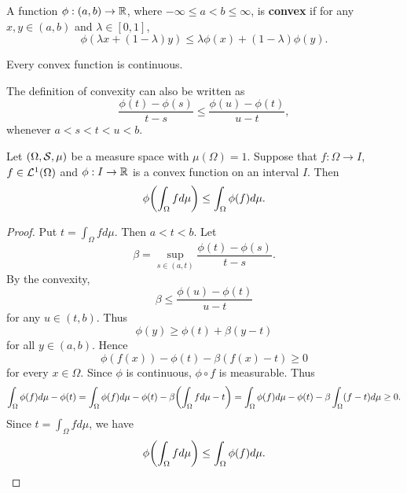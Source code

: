 \begin{definition}
    A function $\phi:(a,b)\to\R$, where $-\infty\leq a < b\leq \infty$, is 
    \textbf{convex} if for any $x,y\in(a,b)$ and $\lambda\in[0,1]$,
    \begin{equation*}
        \phi(\lambda x + (1-\lambda)y) \leq \lambda\phi(x) + (1-\lambda)\phi(y).
    \end{equation*}
\end{definition}
\begin{remark}
    Every convex function is continuous. 
\end{remark}
\begin{remark}
    The definition of convexity can also be written as 
    \begin{equation*}
        \frac{\phi(t)-\phi(s)}{t-s} \leq \frac{\phi(u)-\phi(t)}{u-t},
    \end{equation*}
    whenever $a<s<t<u<b$. 
\end{remark}

\begin{theorem}
    Let $(\Omega,\S,\mu)$ be a measure space with $\mu(\Omega) = 1$. Suppose 
    that $f:\Omega\to I$, $f\in\L^1(\Omega)$ and $\phi:I\to\R$ is a convex 
    function on an interval $I$. Then 
    \begin{equation*}
        \phi\pth{\int_\Omega f d\mu} \leq \int_\Omega \phi(f) d\mu.
    \end{equation*}
\end{theorem}
\begin{proof}
    Put $t = \int_\Omega fd\mu$. Then $a<t<b$. Let 
    \begin{equation*}
        \beta = \sup_{s\in(a,t)} \frac{\phi(t)-\phi(s)}{t-s}.
    \end{equation*}
    By the convexity, 
    \begin{equation*}
        \beta \leq \frac{\phi(u)-\phi(t)}{u-t}
    \end{equation*}
    for any $u\in(t,b)$. Thus 
    \begin{equation*}
        \phi(y) \geq \phi(t) + \beta(y-t)
    \end{equation*}
    for all $y\in(a,b)$. Hence 
    \begin{equation*}
        \phi(f(x)) - \phi(t) - \beta(f(x)-t) \geq 0
    \end{equation*}
    for every $x\in\Omega$. Since $\phi$ is continuous, $\phi\circ f$ is 
    measurable. Thus 
    \begin{equation*}
        \int_\Omega \phi(f) d\mu - \phi(t) = \int_\Omega \phi(f) d\mu - \phi(t) - \beta\pth{\int_\Omega fd\mu - t}
        = \int_\Omega \phi(f) d\mu - \phi(t) - \beta\int_\Omega (f-t)d\mu \geq 0.
    \end{equation*}
    Since $t = \int_\Omega fd\mu$, we have
    \begin{equation*}
        \phi\pth{\int_\Omega f d\mu} \leq \int_\Omega \phi(f) d\mu.
    \end{equation*}
\end{proof}

